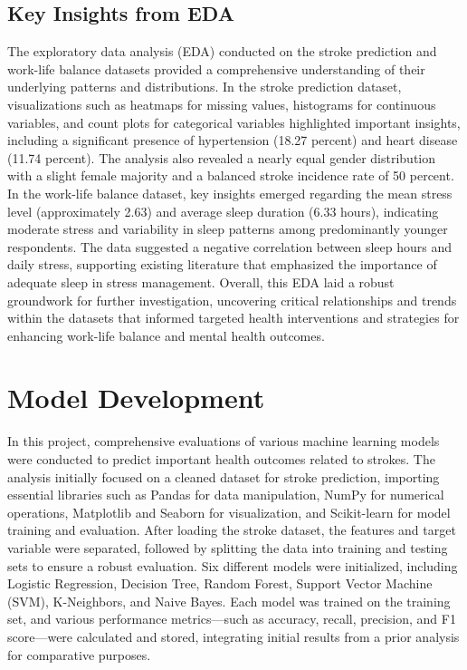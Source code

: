 \documentclass[runningheads]{llncs}
\begin{document}
\begin{enumerate}
\subsection{Key Insights from EDA}
The exploratory data analysis (EDA) conducted on the stroke prediction and work-life balance datasets provided a comprehensive understanding of their underlying patterns and distributions. In the stroke prediction dataset, visualizations such as heatmaps for missing values, histograms for continuous variables, and count plots for categorical variables highlighted important insights, including a significant presence of hypertension (18.27 percent) and heart disease (11.74 percent). The analysis also revealed a nearly equal gender distribution with a slight female majority and a balanced stroke incidence rate of 50 percent. In the work-life balance dataset, key insights emerged regarding the mean stress level (approximately 2.63) and average sleep duration (6.33 hours), indicating moderate stress and variability in sleep patterns among predominantly younger respondents. The data suggested a negative correlation between sleep hours and daily stress, supporting existing literature that emphasized the importance of adequate sleep in stress management. Overall, this EDA laid a robust groundwork for further investigation, uncovering critical relationships and trends within the datasets that informed targeted health interventions and strategies for enhancing work-life balance and mental health outcomes.

\section{Model Development}
In this project, comprehensive evaluations of various machine learning models were conducted to predict important health outcomes related to strokes. The analysis initially focused on a cleaned dataset for stroke prediction, importing essential libraries such as Pandas for data manipulation, NumPy for numerical operations, Matplotlib and Seaborn for visualization, and Scikit-learn for model training and evaluation. After loading the stroke dataset, the features and target variable were separated, followed by splitting the data into training and testing sets to ensure a robust evaluation. Six different models were initialized, including Logistic Regression, Decision Tree, Random Forest, Support Vector Machine (SVM), K-Neighbors, and Naive Bayes. Each model was trained on the training set, and various performance metrics—such as accuracy, recall, precision, and F1 score—were calculated and stored, integrating initial results from a prior analysis for comparative purposes.


\end{enumerate}
\end{document}
